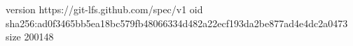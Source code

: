 version https://git-lfs.github.com/spec/v1
oid sha256:ad0f3465bb5ea18bc579fb48066334d482a22ecf193da2be877ad4e4dc2a0473
size 200148
